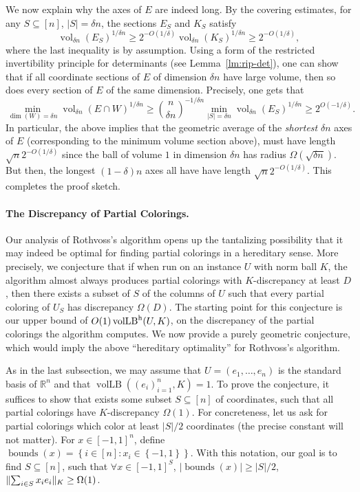 \documentclass[11pt]{article}
\newcommand{\R}{{\mathbb{R}}}
\newcommand{\set}[1]{\left\{ #1 \right\}}
\DeclareMathOperator{\vollb}{volLB}
\DeclareMathOperator{\vol}{vol}
\DeclareMathOperator{\bnds}{bounds}
\DeclarePairedDelimiter\norm{\lVert}{\rVert}
\begin{document}
We now explain why the axes of $E$ are indeed long. By the covering estimates,
for any $S \subseteq [n]$, $|S| = \delta n$, the sections $E_S$ and $K_S$ satisfy
\[
\vol_{\delta n}(E_S)^{1/{\delta n}} \geq 2^{-O(1/\delta)} \vol_{\delta
n}(K_S)^{1/{\delta n}} \geq 2^{-O(1/\delta)},
\]
where the last inequality is by assumption. Using a form of the
restricted invertibility principle for determinants (see
Lemma~\ref{lm:rip-det}), one can show that if all coordinate sections of $E$
of dimension $\delta n$ have large volume, then so does every section of $E$ of
the same dimension.  Precisely, one gets that 
\[
\min_{\dim(W)=\delta n} \vol_{\delta n}(E \cap W)^{1/\delta n} \geq \binom{n}{\delta
n}^{-1/\delta n} \min_{|S|=\delta n} \vol_{\delta n}(E_S)^{1/\delta n} \geq
2^{O(-1/\delta)}.
\]
In particular, the above implies that the geometric average of the
\emph{shortest} $\delta n$ axes of $E$ (corresponding to the minimum volume
section above), must have length $\sqrt{n}2^{-O(1/\delta)}$ since the ball of
volume $1$ in dimension $\delta n$ has radius $\Omega(\sqrt{\delta n})$. But
then, the longest $(1-\delta) n$ axes all have have length
$\sqrt{n}2^{-O(1/\delta)}$. This completes the proof sketch.  

\paragraph{\bf The Discrepancy of Partial Colorings.} Our analysis of Rothvoss's
algorithm opens up the tantalizing possibility that it may indeed be optimal for
finding partial colorings in a hereditary sense. More precisely, we conjecture
that if when run on an instance $U$ with norm ball $K$, the algorithm almost
always produces partial colorings with $K$-discrepancy at least $D$, then there
exists a subset of $S$ of the columns of $U$ such that every partial coloring
of $U_S$ has discrepancy $\Omega(D)$. The starting point for this conjecture is
our upper bound of $O(1) \vollb^{\rm h}(U,K)$, on the discrepancy of the partial
colorings the algorithm computes. We now provide a purely geometric conjecture,
which would imply the above ``hereditary optimality'' for Rothvoss's algorithm. 

As in the last subsection, we may assume that $U=(e_1,\dots,e_n)$ is the
standard basis of $\R^n$ and that $\vollb((e_i)_{i=1}^n,K) = 1$. To prove the
conjecture, it suffices to show that exists some subset $S \subseteq [n]$ of
coordinates, such that all partial colorings have $K$-discrepancy $\Omega(1)$.
For concreteness, let us ask for partial colorings which color at least $|S|/2$
coordinates (the precise constant will not matter). For $x \in [-1,1]^n$, define
$\bnds(x) = \set{i \in [n]: x_i \in \set{-1,1}}$.  With this notation, our goal
is to find $S \subseteq [n]$, such that $\forall x \in [-1,1]^S$, $|\bnds(x)|
\geq |S|/2$, $\norm{\sum_{i \in S} x_i e_i}_K \geq \Omega(1)$.
\end{document}
